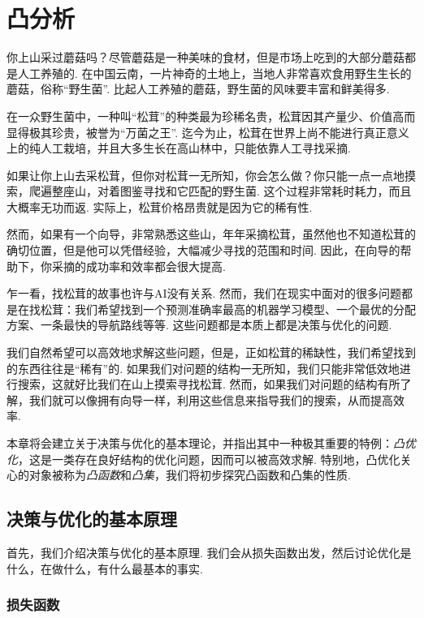 \chapter{凸分析}\label{chap:convex-analysis}

你上山采过蘑菇吗？尽管蘑菇是一种美味的食材，但是市场上吃到的大部分蘑菇都是人工养殖的. 在中国云南，一片神奇的土地上，当地人非常喜欢食用野生生长的蘑菇，俗称“野生菌”. 比起人工养殖的蘑菇，野生菌的风味要丰富和鲜美得多. 

在一众野生菌中，一种叫“松茸”的种类最为珍稀名贵，松茸因其产量少、价值高而显得极其珍贵，被誉为“万菌之王”. 迄今为止，松茸在世界上尚不能进行真正意义上的纯人工栽培，并且大多生长在高山林中，只能依靠人工寻找采摘. 

如果让你上山去采松茸，但你对松茸一无所知，你会怎么做？你只能一点一点地摸索，爬遍整座山，对着图鉴寻找和它匹配的野生菌. 这个过程非常耗时耗力，而且大概率无功而返. 实际上，松茸价格昂贵就是因为它的稀有性. 

然而，如果有一个向导，非常熟悉这些山，年年采摘松茸，虽然他也不知道松茸的确切位置，但是他可以凭借经验，大幅减少寻找的范围和时间. 因此，在向导的帮助下，你采摘的成功率和效率都会很大提高. 

乍一看，找松茸的故事也许与AI没有关系. 然而，我们在现实中面对的很多问题都是在找松茸：我们希望找到一个预测准确率最高的机器学习模型、一个最优的分配方案、一条最快的导航路线等等. 这些问题都是本质上都是决策与优化的问题. 

我们自然希望可以高效地求解这些问题，但是，正如松茸的稀缺性，我们希望找到的东西往往是“稀有”的. 如果我们对问题的结构一无所知，我们只能非常低效地进行搜索，这就好比我们在山上摸索寻找松茸. 然而，如果我们对问题的结构有所了解，我们就可以像拥有向导一样，利用这些信息来指导我们的搜索，从而提高效率. 

本章将会建立关于决策与优化的基本理论，并指出其中一种极其重要的特例：\textit{凸优化}，这是一类存在良好结构的优化问题，因而可以被高效求解. 特别地，凸优化关心的对象被称为\textit{凸函数}和\textit{凸集}，我们将初步探究凸函数和凸集的性质. 

\section{决策与优化的基本原理}\label{sec:decision-optimization-principle}

首先，我们介绍决策与优化的基本原理. 我们会从损失函数出发，然后讨论优化是什么，在做什么，有什么最基本的事实. 

\subsection{损失函数}

